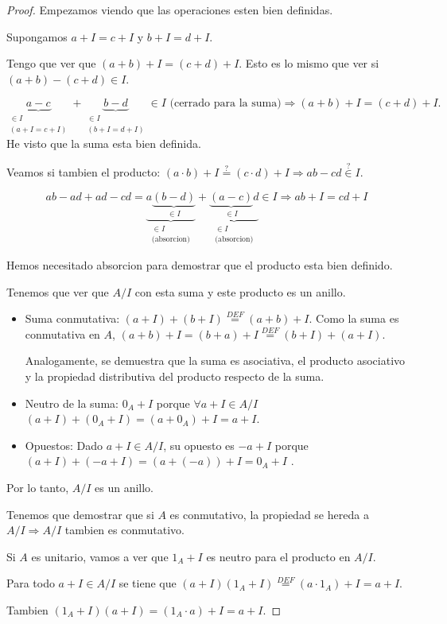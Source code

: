 \begin{proof}
	Empezamos viendo que las operaciones esten bien definidas.
	
	Supongamos \(a + I = c + I \) y \(b + I = d + I \).
	
	Tengo que ver que \((a + b) + I = (c + d ) + I \). Esto es lo mismo que ver si \((a + b) - (c + d ) \in I \).
	
	\[
		\underbrace{a-c}_{\substack{\in I \\(a + I = c + I)}} + \underbrace{b - d}_{\substack{\in I \\(b + I = d + I)}} \in I \text{ (cerrado para la suma)} \Rightarrow (a + b) + I = (c + d) + I 	.
	\]
	He visto que la suma esta bien definida.
	
	Veamos si tambien el producto: \((a \cdot b) + I \overset{?}{=} (c \cdot d ) + I \Rightarrow ab - cd \overset{?}{\in } I \).
	
	\[
		ab - ad + ad - cd = \underbrace{a\underbrace{(b - d)}_{\in I}}_{\substack{\in I \\ \text{(absorcion)}}} + \underbrace{\underbrace{(a - c)}_{\in I}d }_{\substack{\in I \\ \text{(absorcion)}}} \in I \Rightarrow ab + I = cd + I
	\]
	\begin{remark}
		Hemos necesitado absorcion para demostrar que el producto esta bien definido.
	\end{remark}
	
	Tenemos que ver que \(A/I \) con esta suma y este producto es un anillo.
	
	\begin{itemize}
		\item Suma conmutativa: \((a + I) + (b + I) \overset{DEF}{=} (a + b) + I\). Como la suma es conmutativa en \(A \), \((a + b) + I = (b + a) + I \overset{DEF}{=} (b + I) + (a + I )\).
		      
		      Analogamente, se demuestra que la suma es asociativa, el producto asociativo y la propiedad distributiva del producto respecto de la suma.
		\item Neutro de la suma: \(0_A + I \) porque \(\forall a + I \in A/I \) \((a + I) + (0_A + I) = (a + 0_A) + I = a + I \).
		\item Opuestos: Dado \(a + I \in A/I \), su opuesto es \(-a + I \) porque \((a + I) + (-a + I) = (a + (-a)) + I = 0_A + I\) .
	\end{itemize}
	Por lo tanto, \(A/I \) es un anillo.
	
	Tenemos que demostrar que si \(A \) es conmutativo, la propiedad se hereda a \(A/I \Rightarrow A/I \) tambien es conmutativo.
	
	Si \(A \) es unitario, vamos a ver que \(1_A + I \) es neutro para el producto en \(A/I \).
	
	Para todo \(a + I \in A/I \) se tiene que \((a + I )(1_A + I) \overset{DEF}{=} (a \cdot 1_A) + I = a + I \).
	
	Tambien \((1_A + I)(a + I) = (1_A \cdot a ) + I = a + I \).
\end{proof}

